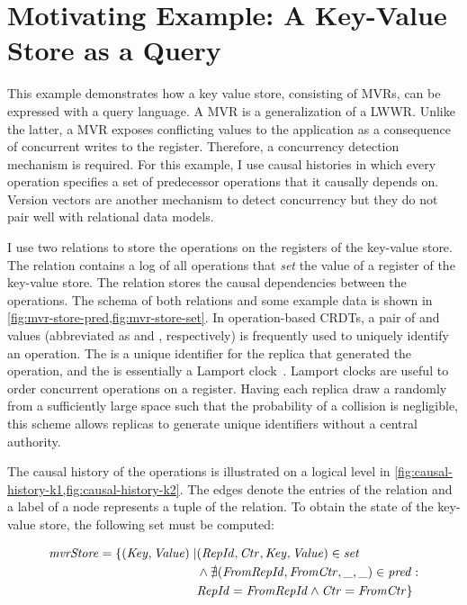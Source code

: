 \section{Motivating Example: A Key-Value Store as a Query}\label{sec:motivating-example}

This example demonstrates how a key value store,
consisting of \aclp{MVR}, can be expressed with a query language.
A \ac{MVR} is a generalization of a \ac{LWWR}.
Unlike the latter, a \ac{MVR} exposes conflicting values to the application
as a consequence of concurrent writes to the register.
Therefore, a concurrency detection mechanism is required.
For this example, I use causal histories in which every operation specifies
a set of predecessor operations that it causally depends on.
Version vectors are another mechanism to detect concurrency
but they do not pair well with relational data models.

I use two relations to store the operations on the registers of the key-value store.
The  relation contains a log of all operations that \emph{set} the
value of a register of the key-value store.
The  relation stores the causal dependencies between the operations.
The schema of both relations and some example data is shown in
\ref{fig:mvr-store-pred,fig:mvr-store-set}.
In operation-based \acp{CRDT}, a pair of  and  values
(abbreviated as  and , respectively) is frequently used
to uniquely identify an operation.
The  is a unique identifier for the replica that generated the
operation, and the  is essentially a Lamport clock~\cite{lamport2019time}.
Lamport clocks are useful to order concurrent operations on a register.
Having each replica draw a  randomly from a sufficiently large space
such that the probability of a collision is negligible,
this scheme allows replicas to generate unique identifiers without a central authority.



The causal history of the operations is illustrated on a logical level
in \ref{fig:causal-history-k1,fig:causal-history-k2}.
The edges denote the entries of the  relation and a
 label of a node represents a tuple of the
 relation.
To obtain the state of the key-value store, the following set must be computed:

\begin{align*}
	\mathit{mvrStore} = \{ (\mathit{Key}, \mathit{Value}) \mid
	 & (\mathit{RepId}, \mathit{Ctr}, \mathit{Key}, \mathit{Value}) \in \mathit{set}                      \\
	 & \land \nexists (\mathit{FromRepId}, \mathit{FromCtr}, \mathit{\_}, \mathit{\_}) \in \mathit{pred}: \\
	 & \mathit{RepId} = \mathit{FromRepId} \land \mathit{Ctr} = \mathit{FromCtr} \}
\end{align*}

